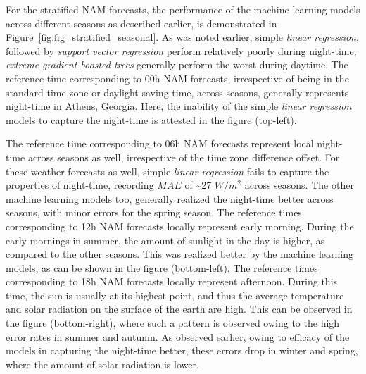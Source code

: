 \par For the stratified NAM forecasts, the performance of the machine learning models across different seasons as described earlier, is demonstrated in Figure~\ref{fig:fig_stratified_seasonal}. As was noted earlier, simple \textit{linear regression}, followed by \textit{support vector regression} perform relatively poorly during night-time; \textit{extreme gradient boosted trees} generally perform the worst during daytime. The reference time corresponding to 00h NAM forecasts, irrespective of being in the standard time zone or daylight saving time, across seasons, generally represents night-time in Athens, Georgia. Here, the inability of the simple \textit{linear regression} models to capture the night-time is attested in the figure (top-left).

\par The reference time corresponding to 06h NAM forecasts represent local night-time across seasons as well, irrespective of the time zone difference offset. For these weather forecasts as well, simple \textit{linear regression} fails to capture the properties of night-time, recording $MAE$ of \textasciitilde 27 $W/m^2$ across seasons. The other machine learning models too, generally realized the night-time better across seasons, with minor errors for the spring season. The reference times corresponding to 12h NAM forecasts locally represent early morning. During the early mornings in summer, the amount of sunlight in the day is higher, as compared to the other seasons. This was realized better by the machine learning models, as can be shown in the figure (bottom-left). The reference times corresponding to 18h NAM forecasts locally represent afternoon. During this time, the sun is usually at its highest point, and thus the average temperature and solar radiation on the surface of the earth are high. This can be observed in the figure (bottom-right), where such a pattern is observed owing to the high error rates in summer and autumn. As observed earlier, owing to efficacy of the models in capturing the night-time better, these errors drop in winter and spring, where the amount of solar radiation is lower.

\newpage